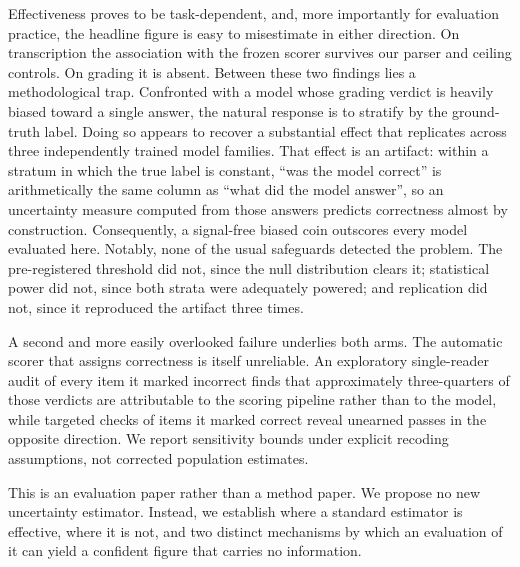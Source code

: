 \documentclass[10pt,twocolumn,letterpaper]{article}
\begin{document}
Effectiveness proves to be task-dependent, and, more importantly for
evaluation practice, the headline figure is easy to misestimate in either
direction. On transcription the association with the frozen scorer survives
our parser and ceiling controls. On grading it is absent. Between these two findings lies
a methodological trap. Confronted with a model whose grading verdict is
heavily biased toward a single answer, the natural response is to
stratify by the ground-truth label. Doing so appears to recover a
substantial effect that replicates across three independently trained
model families. That effect is an artifact: within a stratum in which the
true label is constant, ``was the model correct'' is arithmetically the
same column as ``what did the model answer'', so an uncertainty measure
computed from those answers predicts correctness almost by construction.
Consequently, a signal-free biased coin outscores every model evaluated
here. Notably, none of the usual safeguards detected the problem. The
pre-registered threshold did not, since the null distribution clears it;
statistical power did not, since both strata were adequately powered; and
replication did not, since it reproduced the artifact three times.

A second and more easily overlooked failure underlies both arms. The
automatic scorer that assigns correctness is itself unreliable. An
exploratory single-reader audit of every item it marked incorrect finds that
approximately three-quarters of those verdicts are attributable to the
scoring pipeline rather than to the model, while targeted checks of items it
marked correct reveal unearned passes in the opposite direction. We report
sensitivity bounds under explicit recoding assumptions, not corrected
population estimates.

This is an evaluation paper rather than a method paper. We propose no new
uncertainty estimator. Instead, we establish where a standard estimator is
effective, where it is not, and two distinct mechanisms by which an
evaluation of it can yield a confident figure that carries no information.

\end{document}
